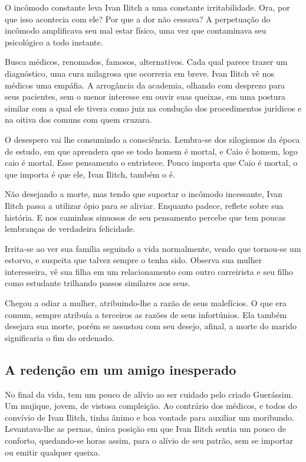 \documentclass{extarticle}
\begin{document}
O incômodo constante leva Ivan Ilitch a uma constante irritabilidade.
Ora, por que isso acontecia com ele? Por que a dor não cessava? A
perpetuação do incômodo amplificava seu mal estar físico, uma vez que
contaminava seu psicológico a todo instante.

Busca médicos, renomados, famosos, alternativos. Cada qual parece trazer
um diagnóstico, uma cura milagrosa que ocorreria em breve. Ivan Ilitch
vê nos médicos uma empáfia. A arrogância da academia, olhando com
desprezo para seus pacientes, sem o menor interesse em ouvir suas
queixas, em uma postura similar com a qual ele tivera como juiz na
condução dos procedimentos jurídicos e na oitiva dos comuns com quem
cruzara.

O desespero vai lhe consumindo a consciência. Lembra-se dos silogismos
da época de estudo, em que aprendera que se todo homem é mortal, e Caio
é homem, logo caio é mortal. Esse pensamento o entristece. Pouco importa
que Caio é mortal, o que importa é que ele, Ivan Ilitch, também o é.

Não desejando a morte, mas tendo que suportar o incômodo incessante,
Ivan Ilitch passa a utilizar ópio para se aliviar. Enquanto padece,
reflete sobre sua história. E nos caminhos sinuosos de seu pensamento
percebe que tem poucas lembranças de verdadeira felicidade.

Irrita-se ao ver sua família seguindo a vida normalmente, vendo que
tornou-se um estorvo, e suspeita que talvez sempre o tenha sido. Observa
sua mulher interesseira, vê sua filha em um relacionamento com outro
carreirista e seu filho como estudante trilhando passos similares aos
seus.

Chegou a odiar a mulher, atribuindo-lhe a razão de seus malefícios. O
que era comum, sempre atribuía a terceiros as razões de seus
infortúnios. Ela também desejara sua morte, porém se assustou com seu
desejo, afinal, a morte do marido significaria o fim do ordenado.

\subsection{A redenção em um amigo inesperado}

No final da vida, tem um pouco de alívio ao ser cuidado pelo criado
Guerássim. Um mujique, jovem, de vistosa compleição. Ao contrário dos
médicos, e todos do convívio de Ivan Ilitch, tinha ânimo e boa vontade
para auxiliar um moribundo. Levantava-lhe as pernas, única posição em
que Ivan Ilitch sentia um pouco de conforto, quedando-se horas assim,
para o alívio de seu patrão, sem se importar ou emitir qualquer queixa.
\end{document}
